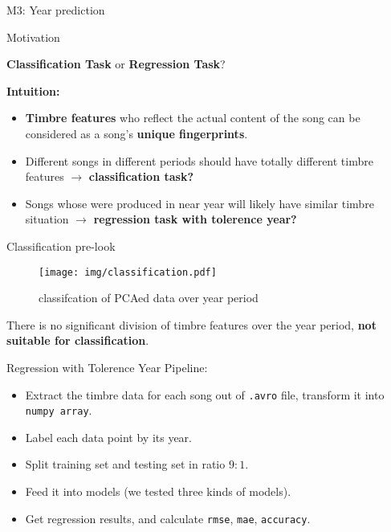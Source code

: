 \documentclass{beamer}
\begin{document}
\begin{section}{M3: Year prediction}
    \begin{frame}{Motivation}
    \begin{center}
        \textbf{Classification Task} or \textbf{Regression Task}?
    \end{center}
    \textbf{Intuition:}
        \begin{itemize}
            \item \textbf{Timbre features} who reflect the actual content of the song can be considered as a song's \textbf{unique fingerprints}.
            \item Different songs in different periods should have totally different timbre features $\longrightarrow$ \textbf{classification task?}
            \item Songs whose were produced in near year will likely have similar timbre situation $\longrightarrow$ \textbf{regression task with tolerence year?}
        \end{itemize}
    \end{frame}
    \begin{frame}{Classification pre-look}
        \begin{figure}
            \centering
            \texttt{[image: img/classification.pdf]}
            \caption{classifcation of PCAed data over year period}
            \label{fig_classification}
        \end{figure}
        \begin{center}
        There is no significant division of timbre features over the year period, \textbf{not suitable for classification}.
        \end{center}
    \end{frame}
    \begin{frame}{Regression with Tolerence Year}
    Pipeline:
        \begin{itemize}
            \item Extract the timbre data for each song out of \texttt{.avro} file, transform it into \texttt{numpy array}.
            \item Label each data point by its year.
            \item Split training set and testing set in ratio $9:1$.
            \item Feed it into models (we tested three kinds of models).
            \item Get regression results, and calculate \texttt{rmse}, \texttt{mae}, \texttt{accuracy}. 

\end{itemize}
\end{frame}
\end{section}
\end{document}
